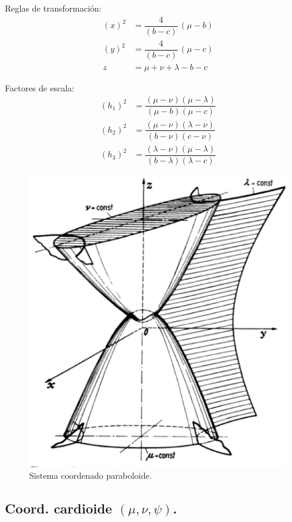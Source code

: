 \documentclass[12pt]{article}
\numberwithin{equation}{section}
\begin{document}
Reglas de transformación:
\begin{align*}
(x)^{2} &= \dfrac{4}{(b - c)} \, (\mu - b) \\[0.5em]
(y)^{2} &= \dfrac{4}{(b - c)} \, (\mu - c) \\[0.5em]
z &= \mu + \nu + \lambda - b - c
\end{align*}

Factores de escala:
\begin{align*}
(h_{1})^{2} &= \dfrac{(\mu - \nu)(\mu - \lambda)}{(\mu - b)(\mu - c)} \\[0.5em]
(h_{2})^{2} &= \dfrac{(\mu - \nu)(\lambda - \nu)}{(b - \nu)(c - \nu)} \\[0.5em]
(h_{3})^{2} &= \dfrac{(\lambda - \nu)(\mu - \lambda)}{(b - \lambda)(\lambda - c)}
\end{align*}

\begin{figure}[H]
    \centering
    \includegraphics[scale=0.5]{Imagenes/Sistema_Paraboloide.eps}
    \caption{Sistema coordenado paraboloide.}
\end{figure}

\subsection{Coord. cardioide \texorpdfstring{$(\mu, \nu, \psi)$}{(m, n, p)}.}
\end{document}

